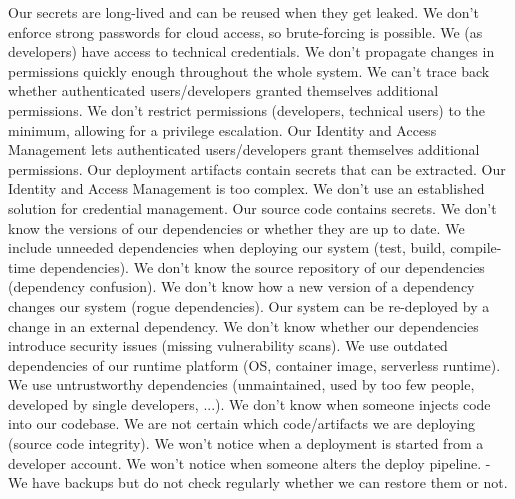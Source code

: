 %

% 
 {Our secrets are long-lived and can be reused when they get leaked.}
 {We don't enforce strong passwords for cloud access, so brute-forcing is possible.}
 {We (as developers) have access to technical credentials.}
 {We don't propagate changes in permissions quickly enough throughout the whole system.}
 {We can't trace back whether authenticated users/developers granted themselves additional permissions.}
 {We don't restrict permissions (developers, technical users) to the minimum, allowing for a privilege escalation.}
 {Our Identity and Access Management lets authenticated users/developers grant themselves additional permissions.}
 {Our deployment artifacts contain secrets that can be extracted.}
 {Our Identity and Access Management is too complex.}
 {We don't use an established solution for credential management.}
 {Our source code contains secrets.}
%
 {We don't know the versions of our dependencies or whether they are up to date.}
 {We include unneeded dependencies when deploying our system (test, build, compile-time dependencies).}
 {We don't know the source repository of our dependencies (dependency confusion).}
 {We don't know how a new version of a dependency changes our system (rogue dependencies).}
 {Our system can be re-deployed by a change in an external dependency.}
 {We don't know whether our dependencies introduce security issues (missing vulnerability scans).}
 {We use outdated dependencies of our runtime platform (OS, container image, serverless runtime).}
 {We use untrustworthy dependencies (unmaintained, used by too few people, developed by single developers, ...).}
 {We don't know when someone injects code into our codebase.}
 {We are not certain which code/artifacts we are deploying (source code integrity).}
 {We won't notice when a deployment is started from a developer account.}
 {We won't notice when someone alters the deploy pipeline.}
%
 {-}
 {We have backups but do not check regularly whether we can restore them or not.}
